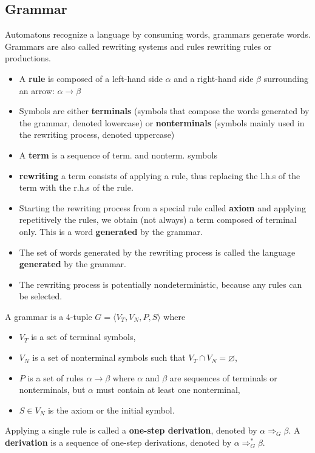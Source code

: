\documentclass[9pt, twocolumn]{extarticle}
\newcommand{\definition}[2]{%
  \begin{definitionbox}{\titlecap{#1}}
    #2
  \end{definitionbox}
}
\begin{document}
\subsection{Grammar}
Automatons recognize a language by consuming words, grammars generate words. Grammars are also called rewriting systems and rules rewriting rules or productions.

\begin{itemize}
  \item A \textbf{rule} is composed of a left-hand side $\alpha$ and a right-hand side $\beta$ surrounding an arrow: $\alpha\rightarrow\beta$
  \item Symbols are either \textbf{terminals} (symbols that compose the words generated by the grammar, denoted lowercase) or \textbf{nonterminals} (symbols mainly used in the rewriting process, denoted uppercase)
  \item A \textbf{term} is a sequence of term. and nonterm. symbols
  \item \textbf{rewriting} a term consists of applying a rule, thus replacing the l.h.s of the term with the r.h.s of the rule.
  \item Starting the rewriting process from a special rule called \textbf{axiom} and applying repetitively the rules, we obtain (not always) a term composed of terminal only. This is a word \textbf{generated} by the grammar.
  \item The set of words generated by the rewriting process is called the language \textbf{generated} by the grammar.
  \item The rewriting process is potentially nondeterministic, because any rules can be selected.
\end{itemize}

\definition{Grammar}{
  A grammar is a 4-tuple $G=\langle V_T, V_N, P, S\rangle$ where
  \begin{itemize}
    \item $V_T$ is a set of terminal symbols,
    \item $V_N$ is a set of nonterminal symbols such that $V_T \cap V_N=\varnothing$,
    \item $P$ is a set of rules $\alpha \rightarrow \beta$ where $\alpha$ and $\beta$ are sequences of terminals or nonterminals, but $\alpha$ must contain at least one nonterminal,
    \item $S \in V_N$ is the axiom or the initial symbol.
  \end{itemize}
}
Applying a single rule is called a \textbf{one-step derivation}, denoted by $\alpha\Rightarrow_G\beta$. A \textbf{derivation} is a sequence of one-step derivations, denoted by $\alpha\Rightarrow_G^*\beta$.\\
\end{document}

